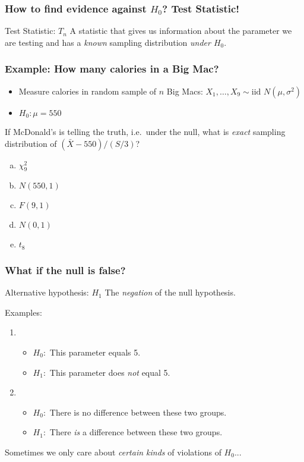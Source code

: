 \documentclass{beamer}
\begin{document}
\begin{frame}
	\frametitle{How to find evidence against $H_0$? Test Statistic!}
	\begin{block}
		{Test Statistic: $T_n$}
		A statistic that gives us information about the parameter we are testing and has a \emph{known} sampling distribution \emph{under $H_0$}.
	\end{block}
\end{frame}

\begin{frame}[t]
	\frametitle{Example: How many calories in a Big Mac? }
\begin{itemize}
	\item Measure calories in random sample of $n$ Big Macs: $X_1, \hdots, X_9 \sim \mbox{iid } N (\mu, \sigma^2)$
	\item $H_0\colon \mu = 550$
\end{itemize}

\vspace{1em}

\alert{If McDonald's is telling the truth, i.e.\ under the null, what is \emph{exact}  sampling distribution of $(\bar{X} - 550)/(S/3)$?}
\begin{enumerate}[(a)]
	\item $\chi^2_{9}$
	\item $N(550, 1)$
	\item $F(9, 1)$
	\item $N(0,1)$ 
	\item $t_{8}$
\end{enumerate}
\end{frame}
\begin{frame}
	\frametitle{What if the null is false?}

	\begin{block}
		{Alternative hypothesis: $H_1$}
		The \emph{negation} of the null hypothesis.
	\end{block}
	\begin{block}
		{Examples:}
		\begin{enumerate}
			\item 
				\begin{itemize}
					\item $H_0\colon$ This parameter equals 5.
				\item $H_1\colon$ This parameter does \emph{not} equal 5.
		\end{itemize}
			\item 
				\begin{itemize}
					\item $H_0\colon$ There is no difference between these two groups.
					\item $H_1\colon$ There \emph{is} a difference between these two groups.
				\end{itemize}
		\end{enumerate}
		
	\end{block}

	\alert{Sometimes we only care about \emph{certain kinds} of violations of $H_0$...}
\end{frame}
\end{document}
